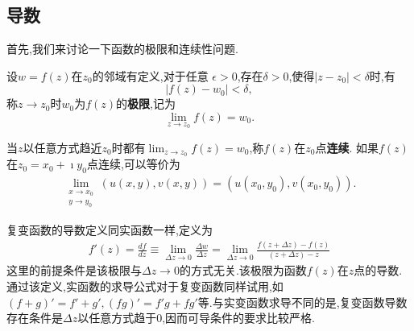 \subsection{导数}

首先,我们来讨论一下函数的极限和连续性问题.
\begin{definition}
    设$w=f(z)$在$z_0$的邻域有定义,对于任意
$\epsilon > 0$,存在$\delta > 0$,使得$|z-z_0| < \delta$时,有
\begin{equation}
    |f(z) - w_0| < \delta ,
\end{equation}
称$z\to z_0$时$w_0$为$f(z)$的{\bf 极限},记为
\begin{equation}
    \lim_{z\to z_0} f(z) = w_0 .
\end{equation}
\end{definition}
当$z$以任意方式趋近$z_0$时都有$ \lim_{z\to z_0} f(z) = w_0$,称$f(z)$在$z_0$点{\bf 连续}.
如果$f(z)$ 在$z_0=x_0 + \imath y_0$点连续,可以等价为
\begin{align}
    \lim_{\substack{x\to x_0\\y\to y_0}} \left(u(x,y), v(x,y)\right) = \left(u(x_0, y_0), v(x_0, y_0)\right) . 
\end{align}

复变函数的导数定义同实函数一样,定义为
\begin{align}
    \label{eq:derivative_def}
    f'(z) = \frac{df}{dz} 
    \equiv\lim_{\Delta z \to 0} \frac{\Delta w} {\Delta z} 
    = \lim_{\Delta z\to 0} \frac{f(z+\Delta z) - f(z) } {(z+\Delta z ) - z}
\end{align}
这里的前提条件是该极限与$\Delta z \to 0$的方式无关.该极限为函数$f(z)$在$z$点的导数.通过该定义,实函数的求导公式对于复变函数同样试用,如
$(f+g)' = f' + g', (fg)' =f'g + fg'$等.与实变函数求导不同的是,复变函数导数存在条件是$\Delta z$以任意方式趋于$0$,因而可导条件的要求比较严格.

